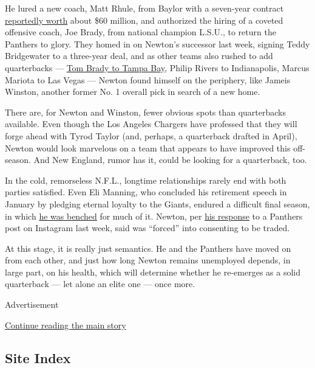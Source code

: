 He lured a new coach, Matt Rhule, from Baylor with a seven-year contract
\href{https://twitter.com/AdamSchefter/status/1214583051478601728}{reportedly
worth} about \$60 million, and authorized the hiring of a coveted
offensive coach, Joe Brady, from national champion L.S.U., to return the
Panthers to glory. They homed in on Newton's successor last week,
signing Teddy Bridgewater to a three-year deal, and as other teams also
rushed to add quarterbacks ---
\href{https://www.nytimes3xbfgragh.onion/2020/03/20/sports/football/tom-brady-signed-tampa-bay.html}{Tom
Brady to Tampa Bay}, Philip Rivers to Indianapolis, Marcus Mariota to
Las Vegas --- Newton found himself on the periphery, like Jameis
Winston, another former No. 1 overall pick in search of a new home.

There are, for Newton and Winston, fewer obvious spots than quarterbacks
available. Even though the Los Angeles Chargers have professed that they
will forge ahead with Tyrod Taylor (and, perhaps, a quarterback drafted
in April), Newton would look marvelous on a team that appears to have
improved this off-season. And New England, rumor has it, could be
looking for a quarterback, too.

In the cold, remorseless N.F.L., longtime relationships rarely end with
both parties satisfied. Even Eli Manning, who concluded his retirement
speech in January by pledging eternal loyalty to the Giants, endured a
difficult final season, in which
\href{https://www.nytimes3xbfgragh.onion/2019/09/17/sports/eli-manning-giants-daniel-jones.html}{he
was benched} for much of it. Newton, per
\href{https://twitter.com/JourdanRodrigue/status/1239939358431600641}{his
response} to a Panthers post on Instagram last week, said was ``forced''
into consenting to be traded.

At this stage, it is really just semantics. He and the Panthers have
moved on from each other, and just how long Newton remains unemployed
depends, in large part, on his health, which will determine whether he
re-emerges as a solid quarterback --- let alone an elite one --- once
more.

Advertisement

\protect\hyperlink{after-bottom}{Continue reading the main story}

\hypertarget{site-index}{%
\subsection{Site Index}\label{site-index}}

